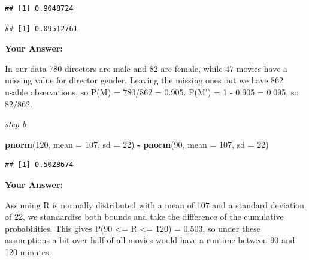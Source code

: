 \documentclass[
]{article}
\newenvironment{Shaded}{\begin{snugshade}}{\end{snugshade}}
\newcommand{\AttributeTok}[1]{\textcolor[rgb]{0.13,0.29,0.53}{#1}}
\newcommand{\CommentTok}[1]{\textcolor[rgb]{0.56,0.35,0.01}{\textit{#1}}}
\newcommand{\ConstantTok}[1]{\textcolor[rgb]{0.56,0.35,0.01}{#1}}
\newcommand{\DecValTok}[1]{\textcolor[rgb]{0.00,0.00,0.81}{#1}}
\newcommand{\FunctionTok}[1]{\textcolor[rgb]{0.13,0.29,0.53}{\textbf{#1}}}
\newcommand{\NormalTok}[1]{#1}
\newcommand{\SpecialCharTok}[1]{\textcolor[rgb]{0.81,0.36,0.00}{\textbf{#1}}}
\newcommand{\StringTok}[1]{\textcolor[rgb]{0.31,0.60,0.02}{#1}}
\begin{document}
\begin{Shaded}
\end{Shaded}

\begin{verbatim}
## [1] 0.9048724
\end{verbatim}

\begin{Shaded}
\end{Shaded}

\begin{verbatim}
## [1] 0.09512761
\end{verbatim}

\textbf{Your Answer:}

In our data 780 directors are male and 82 are female, while 47 movies
have a missing value for director gender. Leaving the missing ones out
we have 862 usable observations, so P(M) = 780/862 = 0.905. P(M') = 1 -
0.905 = 0.095, so 82/862.

\emph{step b}

\begin{Shaded}
\begin{Highlighting}[]
\FunctionTok{pnorm}\NormalTok{(}\DecValTok{120}\NormalTok{, }\AttributeTok{mean =} \DecValTok{107}\NormalTok{, }\AttributeTok{sd =} \DecValTok{22}\NormalTok{) }\SpecialCharTok{{-}} \FunctionTok{pnorm}\NormalTok{(}\DecValTok{90}\NormalTok{, }\AttributeTok{mean =} \DecValTok{107}\NormalTok{, }\AttributeTok{sd =} \DecValTok{22}\NormalTok{)}
\end{Highlighting}
\end{Shaded}

\begin{verbatim}
## [1] 0.5028674
\end{verbatim}

\textbf{Your Answer:}

Assuming R is normally distributed with a mean of 107 and a standard
deviation of 22, we standardise both bounds and take the difference of
the cumulative probabilities. This gives P(90 \textless= R \textless=
120) = 0.503, so under these assumptions a bit over half of all movies
would have a runtime between 90 and 120 minutes.
\end{document}
